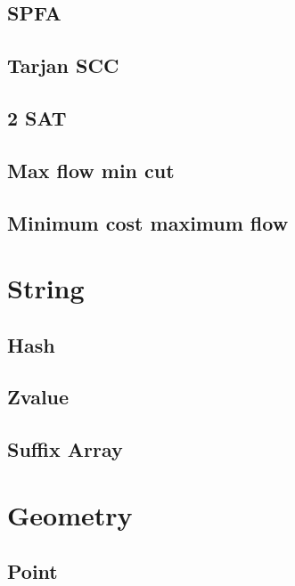 \subsection{SPFA} 

\subsection{Tarjan SCC} 

\subsection{2 SAT} 

% 
\subsection{Max flow min cut} 

\subsection{Minimum cost maximum flow} 


\section{String}
\subsection{Hash} 

\subsection{Zvalue} 

\subsection{Suffix Array} 


\section{Geometry}
\subsection{Point} 


